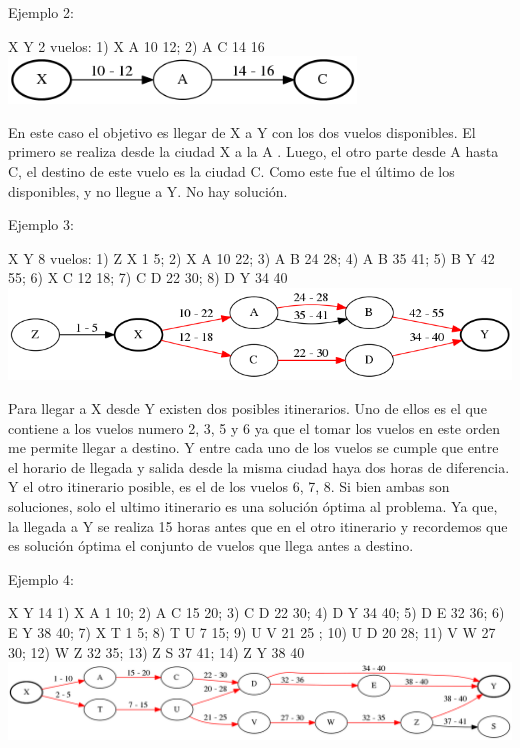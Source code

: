 \documentclass{article}
\begin{document}
Ejemplo 2:

X Y 2
vuelos:
1) X A 10 12;  2) A C  14 16\newline
\includegraphics[width=\textwidth,height=0.5in,keepaspectratio
]{ejemplo2.png}\newline

En este caso el objetivo es llegar de X a Y con los dos vuelos disponibles. El primero  se realiza desde la ciudad X a la A . Luego, el otro parte desde A hasta C, el destino de este vuelo es la ciudad C. Como este fue el último de los disponibles, y  no llegue a Y. No hay solución.\newline \newline

Ejemplo 3:

X Y 8
vuelos:
1) Z X 1 5;  2) X A 10 22;  3) A B  24 28;  4) A B 35 41;   5) B Y 42 55;  6) X C 12 18;
7) C D 22 30;  8) D Y 34 40\newline
\includegraphics[width=\textwidth,height=\textheight,keepaspectratio
]{ejemplo3.png}\newline


Para llegar a X desde Y existen dos posibles itinerarios. Uno de ellos es el que contiene a los vuelos numero 2, 3, 5 y 6 ya que el tomar los vuelos en este orden me permite llegar a destino. Y entre cada uno de los vuelos se cumple que entre el horario de llegada y salida desde la misma ciudad  
haya dos horas de diferencia. Y el otro itinerario posible, es el de los vuelos 6, 7, 8. Si bien ambas son soluciones, solo el ultimo itinerario es una solución óptima al problema. Ya que, la llegada a Y se realiza 15 horas antes que en el otro itinerario y recordemos que es solución óptima el conjunto de vuelos que llega antes a destino.\newline  \newline


Ejemplo 4:

X Y 14
1) X A 1 10;  2) A C 15 20;  3) C D 22 30;  4) D Y 34 40;  5) D E 32 36;  6) E Y 38 40;  7) X T 1 5;
8) T U 7 15;  9) U V 21 25 ;  10) U D 20 28;  11) V W 27 30;  12) W Z 32 35;  13)  Z S 37 41;
14) Z Y 38 40  
\includegraphics[width=\textwidth,height=\textheight,keepaspectratio
]{ejemplo4.png}\newline
\end{document}
